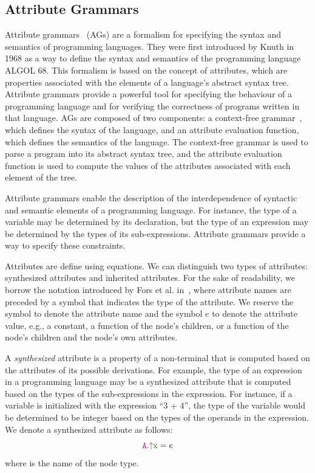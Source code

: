 \subsection{Attribute Grammars}
\label{chap:attr-grammars}
Attribute grammars~\cite{knuth1968semantics} (AGs) are a formalism for specifying
the syntax and semantics of programming languages.
They were first introduced by Knuth in 1968 as a way to define the syntax and semantics of the programming
language ALGOL 68. This formalism is based on the concept of attributes,
which are properties associated with the elements of a language's abstract syntax tree.
Attribute grammars provide a powerful tool for specifying the behaviour of a programming
language and for verifying the correctness of programs written in that language.
%
AGs are composed of two components: a context-free grammar~\cite{CREMERS197586},
which defines the syntax of the language, and an attribute evaluation function,
which defines the semantics of the language. The context-free grammar is used to
parse a program into its abstract syntax tree, and the attribute evaluation function
is used to compute the values of the attributes associated with each element
of the tree.

Attribute grammars enable the description of the
interdependence of syntactic and semantic elements of a programming language.
For instance, the type of a variable may be determined by its declaration,
but the type of an expression may be determined by the types of its sub-expressions.
Attribute grammars provide a way to specify these constraints.

Attributes are define using equations. We can distinguish two types of
attributes: synthesized attributes and inherited attributes.
For the sake of readability, we borrow the notation introduced by Fors et al. in~\cite{fors2020patterns},
where attribute names are preceded by a symbol that indicates the type of the attribute.
We reserve the symbol  to denote the attribute name and the symbol $e$ to denote the attribute value,
e.g., a constant, a function of the node's children, or a function of the node's children
and the node's own attributes.

A \emph{synthesized} attribute is a property of a non-terminal that is computed
based on the attributes of its possible derivations. For example, the type of an expression
in a programming language may be a synthesized attribute that is computed based
on the types of the sub-expressions in the expression. For instance, if a variable is initialized
with the expression ``3 + 4'', the type of the variable would be determined to
be integer based on the types of the operands in the expression.
We denote a synthesized attribute as follows:
\begin{equation*}
  \Asyn{A}{x} = e
  \end{equation*}
where  is the name of the node type.

